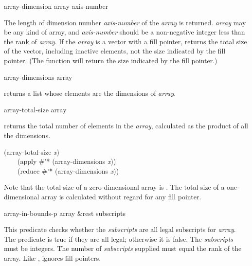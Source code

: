 \begin{defun}[Function]
array-dimension array axis-number

The length of dimension number \emph{axis-number} of the \emph{array} is returned.
\emph{array} may be any kind of array, and \emph{axis-number} should
be a non-negative integer less than the rank of \emph{array}.
If the \emph{array} is a vector with a fill pointer,
 returns the total size of the vector,
including inactive elements,
not the size indicated by the fill pointer.
(The function  will return the size indicated
by the fill pointer.)
\end{defun}

\begin{defun}[Function]
array-dimensions array

 returns a list whose elements are the dimensions
of \emph{array}.
\end{defun}

\begin{defun}[Function]
array-total-size array

 returns the total number of elements in the \emph{array},
calculated as the product of all the dimensions.
\begin{lisp}
(array-total-size \emph{x}) \\
~~~\EQ\ (apply \#'* (array-dimensions \emph{x})) \\
~~~\EQ\ (reduce \#'* (array-dimensions \emph{x}))
\end{lisp}
Note that the total size of a zero-dimensional array is .
The total size of a one-dimensional array is calculated without regard
for any fill pointer.
\end{defun}

\begin{defun}[Function]
array-in-bounds-p array &rest subscripts

This predicate checks whether the \emph{subscripts} are all
legal subscripts for \emph{array}.  The predicate is true if they
are all legal; otherwise it is false.  The \emph{subscripts} must be integers.
The number of \emph{subscripts} supplied must equal the rank of the array.
Like ,  ignores fill pointers.
\end{defun}

